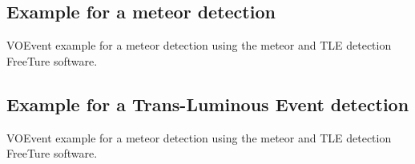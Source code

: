 \documentclass[referee,a4paper,12pt,traditabstract]{swsc}
\begin{document}
\begin{linenumbers}
{\tiny 

}

\subsection{Example for a meteor detection}
\label{appendix-xml-voevent-meteor-freeture}
VOEvent example for a meteor detection using the meteor and TLE detection FreeTure \cite{2014pim4.conf...39A} software.

{\tiny 

}

\subsection{Example for a Trans-Luminous Event detection}
\label{appendix-xml-voevent-tle-freeture}
VOEvent example for a meteor detection using the meteor and TLE detection FreeTure \cite{2014pim4.conf...39A} software.

{\tiny 

}


\end{linenumbers}
\end{document}
